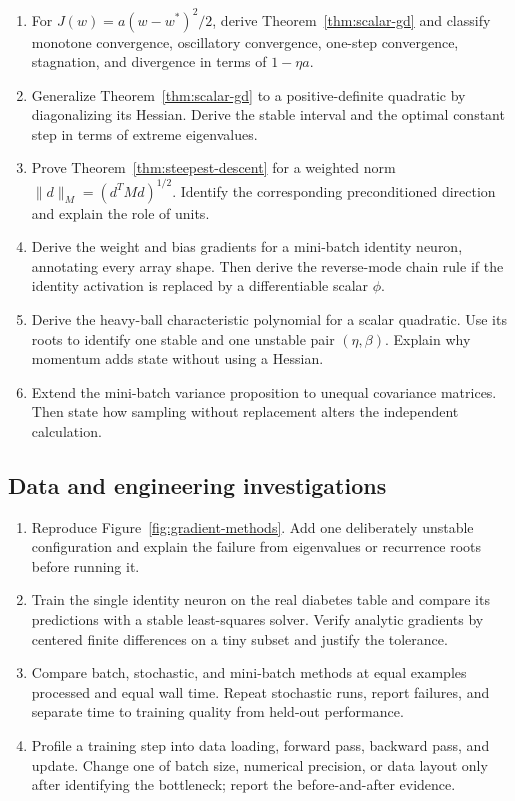 \begin{enumerate}[label=\textbf{GD-M\arabic*.},leftmargin=*,itemsep=0.65em]
  \item For $J(w)=a(w-w^*)^2/2$, derive Theorem~\ref{thm:scalar-gd} and classify
  monotone convergence, oscillatory convergence, one-step convergence,
  stagnation, and divergence in terms of $1-\eta a$.
  \item Generalize Theorem~\ref{thm:scalar-gd} to a positive-definite quadratic
  by diagonalizing its Hessian. Derive the stable interval and the optimal
  constant step in terms of extreme eigenvalues.
  \item Prove Theorem~\ref{thm:steepest-descent} for a weighted norm
  $\lVert d\rVert_M=(d^TMd)^{1/2}$. Identify the corresponding preconditioned
  direction and explain the role of units.
  \item Derive the weight and bias gradients for a mini-batch identity neuron,
  annotating every array shape. Then derive the reverse-mode chain rule if the
  identity activation is replaced by a differentiable scalar $\phi$.
  \item Derive the heavy-ball characteristic polynomial for a scalar quadratic.
  Use its roots to identify one stable and one unstable pair $(\eta,\beta)$.
  Explain why momentum adds state without using a Hessian.
  \item Extend the mini-batch variance proposition to unequal covariance
  matrices. Then state how sampling without replacement alters the independent
  calculation.
\end{enumerate}

\subsection*{Data and engineering investigations}

\begin{enumerate}[label=\textbf{GD-C\arabic*.},leftmargin=*,itemsep=0.65em]
  \item Reproduce Figure~\ref{fig:gradient-methods}. Add one deliberately
  unstable configuration and explain the failure from eigenvalues or recurrence
  roots before running it.
  \item Train the single identity neuron on the real diabetes table and compare
  its predictions with a stable least-squares solver. Verify analytic gradients
  by centered finite differences on a tiny subset and justify the tolerance.
  \item Compare batch, stochastic, and mini-batch methods at equal examples
  processed and equal wall time. Repeat stochastic runs, report failures, and
  separate time to training quality from held-out performance.
  \item Profile a training step into data loading, forward pass, backward pass,
  and update. Change one of batch size, numerical precision, or data layout only
  after identifying the bottleneck; report the before-and-after evidence.
\end{enumerate}

